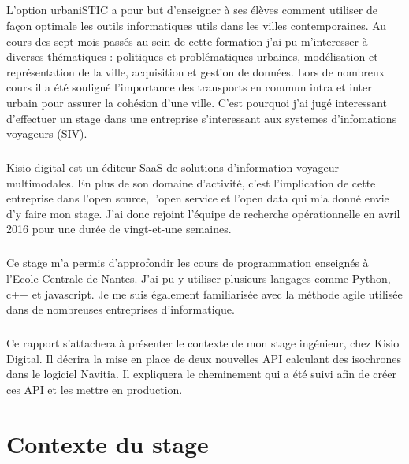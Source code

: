 \documentclass[a4paper]{report}
\begin{document}
\paragraph{} L'option urbaniSTIC a pour but d'enseigner à ses élèves comment utiliser de façon optimale les outils informatiques utils dans les villes contemporaines. Au cours des sept mois passés au sein de cette formation j'ai pu m'interesser à diverses thématiques : politiques et problématiques urbaines, modélisation et représentation de la ville, acquisition et gestion de données. Lors de nombreux cours il a été souligné l'importance des transports en commun intra et inter urbain pour assurer la cohésion d'une ville. C'est pourquoi j'ai jugé interessant d'effectuer un stage dans une entreprise s'interessant aux systemes d'infomations voyageurs (SIV).

\paragraph{} Kisio digital est un éditeur SaaS de solutions d’information voyageur multimodales. En plus de son domaine d'activité, c'est l'implication de cette entreprise dans l'open source, l'open service et l'open data qui m'a donné envie d'y faire mon stage. J'ai donc rejoint l'équipe de recherche opérationnelle en avril 2016 pour une durée de vingt-et-une semaines.

\paragraph{} Ce stage m'a permis d'approfondir les cours de programmation enseignés à l'Ecole Centrale de Nantes. J'ai pu y utiliser plusieurs langages comme Python, c++ et javascript. Je me suis également familiarisée avec la méthode agile utilisée dans de nombreuses entreprises d'informatique. 

\paragraph{} Ce rapport s’attachera  à présenter le contexte de mon stage ingénieur, chez Kisio Digital. Il décrira la mise en place de deux nouvelles API calculant des isochrones dans le logiciel Navitia. Il expliquera le cheminement qui a été suivi afin de créer ces API et les mettre en production.

\chapter{Contexte du stage}
\end{document}
